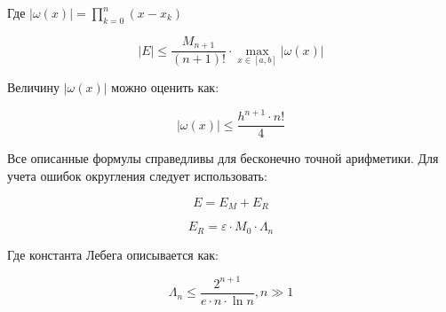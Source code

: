 \documentclass[10pt,a4paper]{article}
\begin{document}
\begin{enumerate}
		Где $\left|\omega\left(x\right)\right| = \prod\limits_{k = 0}^{n}
		\left(x - x_{k}\right)$
		
		\begin{equation}
			\left|E\right| \leqslant \frac{M_{n + 1}}{\left(n + 1\right)!}\cdot
			\max\limits_{x\in \left[a, b\right]}\left|\omega\left(x\right)
			\right|
		\end{equation}
		
		Величину $\left|\omega\left(x\right)\right|$ можно оценить как:
		
		\begin{equation}
			\left|\omega\left(x\right)\right| \leqslant \frac{h^{n + 1} \cdot
			n!}{4}
		\end{equation}
		
		Все описанные формулы справедливы для бесконечно точной арифметики. 
		Для учета ошибок округления следует использовать:
		
		\begin{equation}
			E = E_{M} + E_{R}
		\end{equation}
		
		\begin{equation}
			E_{R} = \varepsilon\cdot M_{0}\cdot\Lambda_{n}
		\end{equation}
		
		Где константа Лебега описывается как:
		
		\begin{equation}
			\Lambda_{n} \leqslant \frac{2^{n + 1}}{e \cdot n \cdot \ln n}, n \gg 
			1
		\end{equation}
	\end{enumerate}
	
\end{document}
